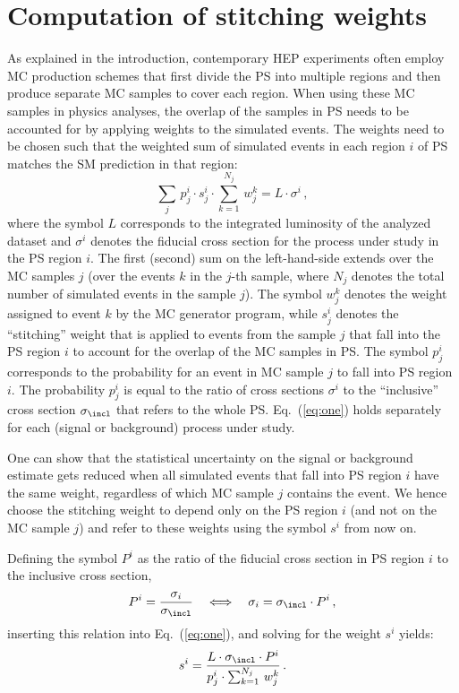 \section{Computation of stitching weights}
\label{sec:stitching_weights}

As explained in the introduction,
contemporary HEP experiments often employ MC production schemes
that first divide the PS into multiple regions and then produce separate MC samples to cover each region.
When using these MC samples in physics analyses,
the overlap of the samples in PS needs to be accounted for by applying weights to the simulated events.
The weights need to be chosen such that the weighted sum of simulated events in each region $i$ of PS 
matches the SM prediction in that region:
\begin{equation}
\sum_{j} \, p_{j}^{i} \cdot s_{j}^{i} \cdot \sum_{k=1}^{N_{j}} \, w_{j}^{k} = L \cdot \sigma^{i} \, ,
\label{eq:one}
\end{equation}
where the symbol $L$ corresponds to the integrated luminosity of the analyzed dataset
and $\sigma^{i}$ denotes the fiducial cross section for the process under study in the PS region $i$.
The first (second) sum on the left-hand-side extends over the MC samples $j$ 
(over the events $k$ in the $j$-th sample, where $N_{j}$ denotes the total number of simulated events in the sample $j$).
The symbol $w_{j}^{k}$ denotes the weight assigned to event $k$ by the MC generator program,
while $s_{j}^{i}$ denotes the ``stitching'' weight that is applied to events from the sample $j$ that fall into the PS region $i$ to account for the overlap of the MC samples in PS.
The symbol $p_{j}^{i}$ corresponds to the probability for an event in MC sample $j$ to fall into PS region $i$.
The probability $p_{j}^{i}$ is equal to the ratio of cross sections $\sigma^{i}$ to the ``inclusive'' cross section $\sigma_{\incl}$ that refers to the whole PS.
Eq.~(\ref{eq:one}) holds separately for each (signal or background) process under study.

One can show that the statistical uncertainty on the signal or background estimate
gets reduced when all simulated events that fall into PS region $i$ have the same weight,
regardless of which MC sample $j$ contains the event.
We hence choose the stitching weight to depend only on the PS region $i$ (and not on the MC sample $j$)
and refer to these weights using the symbol $s^{i}$ from now on.

Defining the symbol $P^{i}$ as the ratio of the fiducial cross section in PS region $i$ to the inclusive cross section,
\begin{equation*}
P^{i} = \frac{\sigma_{i}}{\sigma_{\incl}} \quad \Longleftrightarrow \quad \sigma_{i} = \sigma_{\incl} \cdot P^{i} \, ,
\label{eq:two}
\end{equation*}
inserting this relation into Eq.~(\ref{eq:one}), and solving for the weight $s^{i}$ yields:
\begin{equation}
s^{i} = \frac{L \cdot \sigma_{\incl} \cdot P^{i}}{p_{j}^{i} \cdot \sum_{k=1}^{N_{j}} \, w_{j}^{k}} \, .
\label{eq:master}
\end{equation}

